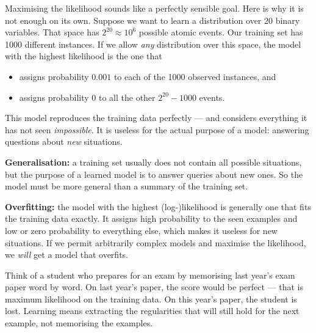 \documentclass[11pt, oneside]{book}
\begin{document}
Maximising the likelihood sounds like a perfectly sensible goal. Here is why
it is not enough on its own. Suppose we want to learn a distribution over 20
binary variables. That space has $2^{20} \approx 10^6$ possible atomic events.
Our training set has 1000 different instances. If we allow \emph{any}
distribution over this space, the model with the highest likelihood is the
one that
\begin{itemize}
  \item assigns probability $0.001$ to each of the 1000 observed instances, and
  \item assigns probability $0$ to all the other $2^{20} - 1000$ events.
\end{itemize}
This model reproduces the training data perfectly --- and considers
everything it has not seen \emph{impossible}. It is useless for the actual
purpose of a model: answering questions about \emph{new} situations.

\begin{defbox}[title={Generalisation and overfitting}]
\textbf{Generalisation:} a training set usually does not contain all possible
situations, but the purpose of a learned model is to answer queries about new
ones. So the model must be more general than a summary of the training set.\par
\textbf{Overfitting:} the model with the highest (log-)likelihood is generally
one that fits the training data exactly. It assigns high probability to the
seen examples and low or zero probability to everything else, which makes it
useless for new situations. If we permit arbitrarily complex models and
maximise the likelihood, we \emph{will} get a model that overfits.
\end{defbox}

\begin{intbox}[unbreakable]
Think of a student who prepares for an exam by memorising last year's exam
paper word by word. On last year's paper, the score would be perfect --- that
is maximum likelihood on the training data. On this year's paper, the student
is lost. Learning means extracting the regularities that will still hold for
the next example, not memorising the examples.
\end{intbox}
\end{document}
